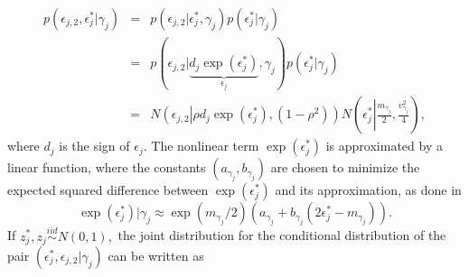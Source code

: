 \documentclass[10pt]{article}
\newcommand{\dNormal}[3]{ N\left( #1 \left| #2, #3 \right. \right) }
\begin{document}
\begin{eqnarray*}
	p( \epsilon_{j,2}, \epsilon_{j}^* | \gamma_j ) &=& p( \epsilon_{j,2} | \epsilon_{j}^*, \gamma_j ) p( \epsilon_{j}^* | \gamma_j) \\
	&=& p( \epsilon_{j,2} | \underbrace{ d_j \exp( \epsilon_{j}^* ) }_{\epsilon_{j}}, \gamma_j ) p( \epsilon_{j}^* | \gamma_j) \\
	&=& \dNormal{\epsilon_{j,2}}{\rho d_j \exp( \epsilon_{j}^* )}{(1-\rho^2) } \dNormal{\epsilon_{j}^*}{ \frac{m_{\gamma_j}}{2} }{ \frac{v_{\gamma_j}^2}{4} },
\end{eqnarray*}
where $d_j$ is the sign of $\epsilon_{j}$. The nonlinear term $\exp( \epsilon_{j}^* )$ is approximated by a linear function, where the constants $(a_{\gamma_j}, b_{\gamma_j})$ are chosen to minimize the expected squared difference between $\exp(\epsilon_{j}^*)$ and its approximation, as done in \cite{omori2007stochastic}
\[
\exp( \epsilon_{j}^* ) | \gamma_j \approx \exp(m_{\gamma_j} /2) (a_{\gamma_j} + b_{\gamma_j}( 2\epsilon_{j}^* - m_{\gamma_j} ) ).
\]
If $z_{j}^*, z_{j} \stackrel{iid}{\sim} N(0,1),$ the joint distribution for the conditional distribution of the pair $(\epsilon_{j}^*, \epsilon_{j,2} | \gamma_j)$ can be written as
\end{document}
